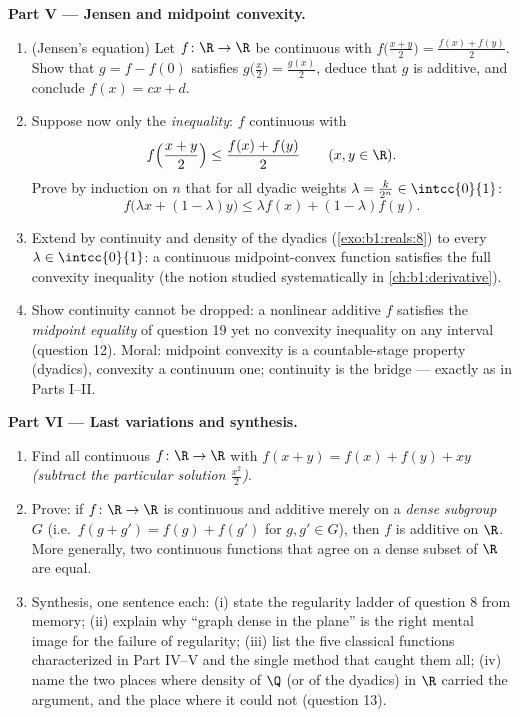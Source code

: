 \begin{problem}[{Weekend problem --- $f(x + y) = f(x) + f(y)$:
regularity forces linearity, and the portrait of the monsters}]
\medskip
\noindent\textbf{Part V --- Jensen and midpoint convexity.}
\begin{enumerate}[resume]
  \item (Jensen's equation) Let $f \colon \R \to \R$ be
        continuous with $f\bigl(\frac{x+y}{2}\bigr) = \frac{f(x)
        + f(y)}{2}$. Show that $g = f - f(0)$ satisfies
        $g\bigl(\frac x2\bigr) = \frac{g(x)}{2}$, deduce that
        $g$ is additive, and conclude $f(x) = cx + d$.
  \item Suppose now only the \emph{inequality}: $f$ continuous
        with
        \[
        f\Bigl(\frac{x + y}{2}\Bigr) \leq \frac{f(x) +
        f(y)}{2} \qquad (x, y \in \R).
        \]
        Prove by induction on $n$ that for all dyadic weights
        $\lambda = \frac{k}{2^n} \in \intcc{0}{1}$:
        \[
        f\bigl(\lambda x + (1 - \lambda)y\bigr) \leq \lambda
        f(x) + (1 - \lambda) f(y) .
        \]
  \item Extend by continuity and density of the dyadics
        (\cref{exo:b1:reals:8}) to every $\lambda \in
        \intcc{0}{1}$: a continuous midpoint-convex function
        satisfies the full convexity inequality (the notion
        studied systematically in \cref{ch:b1:derivative}).
  \item Show continuity cannot be dropped: a nonlinear additive
        $f$ satisfies the \emph{midpoint equality} of question
        19 yet no convexity inequality on any interval (question
        12). Moral: midpoint convexity is a countable-stage
        property (dyadics), convexity a continuum one;
        continuity is the bridge --- exactly as in Parts I--II.
\end{enumerate}

\medskip
\noindent\textbf{Part VI --- Last variations and synthesis.}
\begin{enumerate}[resume]
  \item Find all continuous $f \colon \R \to \R$ with $f(x + y)
        = f(x) + f(y) + xy$ \emph{(subtract the particular
        solution $\frac{x^2}{2}$)}.
  \item Prove: if $f \colon \R \to \R$ is continuous and
        additive merely on a \emph{dense subgroup} $G$ (i.e.\
        $f(g + g') = f(g) + f(g')$ for $g, g' \in G$), then $f$
        is additive on $\R$. More generally, two continuous
        functions that agree on a dense subset of $\R$ are
        equal.
  \item Synthesis, one sentence each: (i) state the regularity
        ladder of question 8 from memory; (ii) explain why
        ``graph dense in the plane'' is the right mental image
        for the failure of regularity; (iii) list the five
        classical functions characterized in Part IV--V and the
        single method that caught them all; (iv) name the two
        places where density of $\Q$ (or of the dyadics) in $\R$
        carried the argument, and the place where it could not
        (question 13).
\end{enumerate}
\end{problem}
